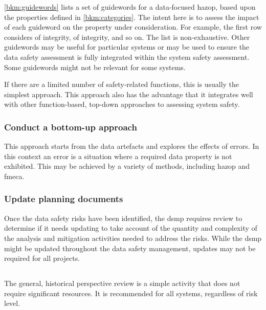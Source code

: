 \autoref{bkm:guidewords} lists a set of guidewords for a data-focused \gls{hazop}, based upon the properties defined in \autoref{bkm:categories}. The intent here is to assess the impact of each guideword on the property under consideration. For example, the first row considers  of \gls{integrity},  of \gls{integrity}, and so on.
The list is non-exhaustive. Other guidewords may be useful for particular systems or may be used to ensure the \gls{data safety assessment} is fully integrated within the system safety assessment. Some guidewords might not be relevant for some systems.

If there are a limited number of safety-related functions, this is usually the simplest approach. This approach also has the advantage that it integrates well with other function-based, top-down approaches to assessing system safety. 

\subsubsection{Conduct a bottom-up approach}
This approach starts from the \glspl{data artefact} and explores the effects of \glspl{error}. In this context an error is a situation where a required \gls{data property} is not exhibited. This may be achieved by a variety of methods, including \gls{hazop} and \gls{fmeca}.

\subsubsection{Update planning documents}
Once the data safety risks have been identified, the \gls{dsmp} requires review to determine if it needs
updating to take account of the quantity and complexity of the analysis and \gls{mitigation} activities needed to address the risks. While the \gls{dsmp} might be updated throughout the \cbstart data safety management\cbend, updates may not be required for all projects.

\subsection{}
The general, historical perspective review is a simple activity that does not require significant resources. It is recommended for all systems, regardless of risk level.

